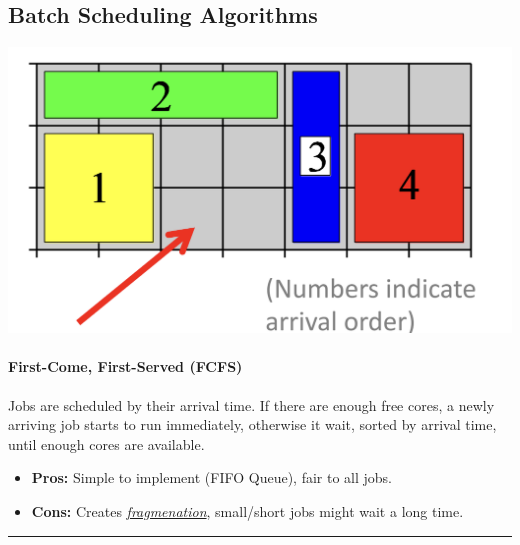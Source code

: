 \documentclass[openany,12pt]{book}
\begin{document}
\subsection*{Batch Scheduling Algorithms}
\begin{center}
  \begin{minipage}{0.30\textwidth}
    \vspace{0pt} %
    \centering
    \includegraphics[width=\linewidth]{FCFS.png}
  \end{minipage}\hfill
  \begin{minipage}{0.65\textwidth}
    \vspace{0pt} %
    \paragraph{First-Come, First-Served (FCFS)} Jobs are scheduled by their arrival time. If there are enough free cores, a newly arriving job starts to run immediately, otherwise it wait, sorted by arrival time, until enough cores are available.
    \begin{itemize}
      \item \textbf{Pros:} Simple to implement (FIFO Queue), fair to all jobs.
      \item \textbf{Cons:} Creates \textit{\ul{fragmenation}}, small/short jobs might wait a long time.
    \end{itemize}
  \end{minipage}
\end{center}

\noindent\rule{\linewidth}{0.4pt}
\end{document}
